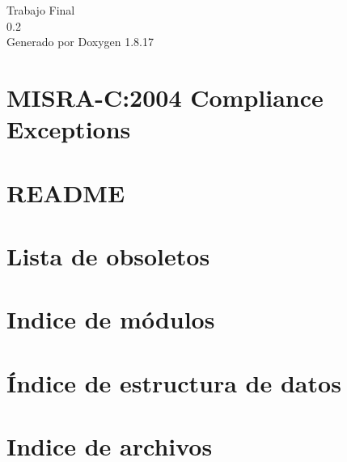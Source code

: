 \let\mypdfximage\pdfximage\def\pdfximage{\immediate\mypdfximage}\documentclass[twoside]{book}
\newcommand{\+}{\discretionary{\mbox{\scriptsize$\hookleftarrow$}}{}{}}
\newcommand{\clearemptydoublepage}{%
  \newpage{\pagestyle{empty}\cleardoublepage}%
}
\begin{document}
\hypersetup{pageanchor=false,
             bookmarksnumbered=true,
             pdfencoding=unicode
            }
\begin{titlepage}
\vspace*{7cm}
\begin{center}%
{\Large Trabajo Final \\[1ex]\large 0.\+2 }\\
\vspace*{1cm}
{\large Generado por Doxygen 1.8.17}\\
\end{center}
\end{titlepage}
\clearemptydoublepage
{}
\tableofcontents
\clearemptydoublepage
{}
\hypersetup{pageanchor=true}

\chapter{M\+I\+S\+R\+A-\/C\+:2004 Compliance Exceptions}
\label{_c_m_s_i_s__m_i_s_r_a__exceptions}

\chapter{R\+E\+A\+D\+ME}
\label{md__r_e_a_d_m_e}

\chapter{Lista de obsoletos}
\label{deprecated}

\chapter{Indice de módulos}

\chapter{Índice de estructura de datos}

\chapter{Indice de archivos}

\end{document}

